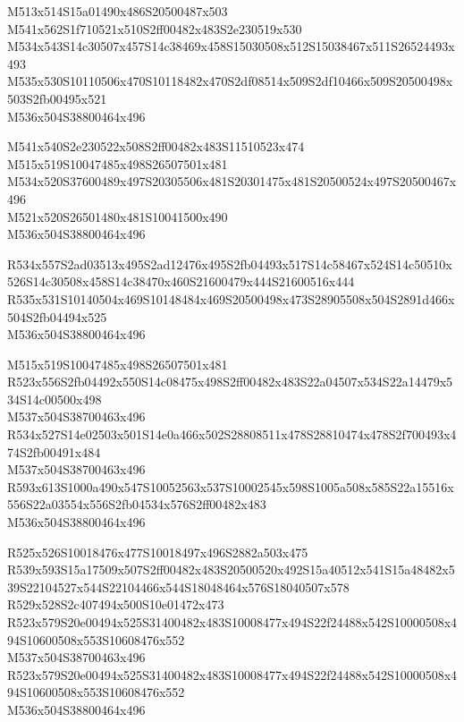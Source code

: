 \documentclass{article}
\begin{document}
\begin{multicols}{5}
\begin{center}
M513x514S15a01490x486S20500487x503 %
\\M541x562S1f710521x510S2ff00482x483S2e230519x530 %
\\M534x543S14c30507x457S14c38469x458S15030508x512S15038467x511S26524493x493 %
\\M535x530S10110506x470S10118482x470S2df08514x509S2df10466x509S20500498x503S2fb00495x521 %
\\M536x504S38800464x496 %

M541x540S2e230522x508S2ff00482x483S11510523x474 %
\\M515x519S10047485x498S26507501x481 %
\\M534x520S37600489x497S20305506x481S20301475x481S20500524x497S20500467x496 %
\\M521x520S26501480x481S10041500x490 %
\\M536x504S38800464x496 %

R534x557S2ad03513x495S2ad12476x495S2fb04493x517S14c58467x524S14c50510x526S14c30508x458S14c38470x460S21600479x444S21600516x444 %
\\R535x531S10140504x469S10148484x469S20500498x473S28905508x504S2891d466x504S2fb04494x525 %
\\M536x504S38800464x496 %

M515x519S10047485x498S26507501x481 %
\\R523x556S2fb04492x550S14c08475x498S2ff00482x483S22a04507x534S22a14479x534S14c00500x498 %
\\M537x504S38700463x496 %
\\R534x527S14e02503x501S14e0a466x502S28808511x478S28810474x478S2f700493x474S2fb00491x484 %
\\M537x504S38700463x496 %
\\R593x613S1000a490x547S10052563x537S10002545x598S1005a508x585S22a15516x556S22a03554x556S2fb04534x576S2ff00482x483 %
\\M536x504S38800464x496 %

R525x526S10018476x477S10018497x496S2882a503x475 %
\\R539x593S15a17509x507S2ff00482x483S20500520x492S15a40512x541S15a48482x539S22104527x544S22104466x544S18048464x576S18040507x578 %
\\R529x528S2c407494x500S10e01472x473 %
\\R523x579S20e00494x525S31400482x483S10008477x494S22f24488x542S10000508x494S10600508x553S10608476x552 %
\\M537x504S38700463x496 %
\\R523x579S20e00494x525S31400482x483S10008477x494S22f24488x542S10000508x494S10600508x553S10608476x552 %
\\M536x504S38800464x496 %


\end{center}
\end{multicols}
\end{document}
